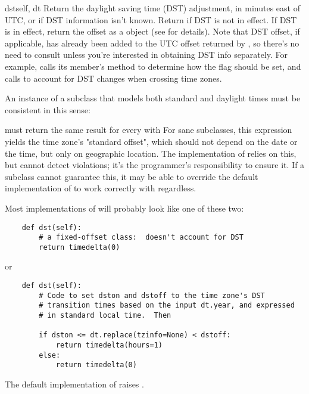 \begin{methoddesc}{dst}{self, dt}
  Return the daylight saving time (DST) adjustment, in minutes east of
  UTC, or  if DST information isn't known.  Return
   if DST is not in effect.
  If DST is in effect, return the offset as a
   object (see  for details).
  Note that DST offset, if applicable, has
  already been added to the UTC offset returned by
  , so there's no need to consult 
  unless you're interested in obtaining DST info separately.  For
  example,  calls its 
  member's  method to determine how the
   flag should be set, and
   calls  to account for
  DST changes when crossing time zones.

  An instance  of a  subclass that models both
  standard and daylight times must be consistent in this sense:


  must return the same result for every  
  with   For sane 
  subclasses, this expression yields the time zone's "standard offset",
  which should not depend on the date or the time, but only on geographic
  location.  The implementation of  relies
  on this, but cannot detect violations; it's the programmer's
  responsibility to ensure it.  If a  subclass cannot
  guarantee this, it may be able to override the default implementation
  of  to work correctly with 
  regardless.

  Most implementations of  will probably look like one
  of these two:

\begin{verbatim}
    def dst(self):
        # a fixed-offset class:  doesn't account for DST
        return timedelta(0)
\end{verbatim}

  or

\begin{verbatim}
    def dst(self):
        # Code to set dston and dstoff to the time zone's DST
        # transition times based on the input dt.year, and expressed
        # in standard local time.  Then

        if dston <= dt.replace(tzinfo=None) < dstoff:
            return timedelta(hours=1)
        else:
            return timedelta(0)
\end{verbatim}

  The default implementation of  raises
  .
\end{methoddesc}

